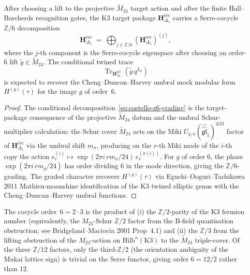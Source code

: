 \begin{theorem}
\label{thm:costello-z6-graded-H-Delta5}
After choosing a lift to the projective
$\widetilde M_{24}$ target action and after the finite Hall--Borcherds
recognition gates, the K3 target package
$\mathbf{H}_{\Delta_5}^{\mathrm{rec}}$ carries a Serre-cocycle
$\mathbb{Z}/6$ decomposition
\begin{equation}
\label{eq:costello-z6-grading}
\mathbf{H}_{\Delta_5}^{\mathrm{rec}}
\;=\;
\bigoplus_{j\in\mathbb{Z}/6}
(\mathbf{H}_{\Delta_5}^{\mathrm{rec}})^{(j)},
\end{equation}
where the $j$-th component is the Serre-cocycle eigenspace after
choosing an order-$6$ lift \(\tilde g\in\widetilde M_{24}\). The
conditional twined trace
\[
\operatorname{Tr}_{\mathbf H_{\Delta_5}^{\mathrm{rec}}}
(\tilde g\,q^{L_0})
\]
is expected to recover the Cheng--Duncan--Harvey umbral mock modular
form $H^{(g)}(\tau)$ for the image $g$ of order~$6$.
\end{theorem}

\begin{proof}[Proof]
The conditional decomposition~\eqref{eq:costello-z6-grading}
is the target-package consequence of the projective
$\widetilde M_{24}$ datum and the umbral Schur-multiplier calculation:
the Schur cover $\widetilde M_{24}$ acts on the Miki
$U_{q,\kappa}(\widehat{\widehat{\mathfrak{gl}}}_1)^{\otimes 24}$
factor of $\mathbf{H}_{\Delta_5}^{\mathrm{rec}}$ via the umbral shift
$m_\sigma$, producing on the $r$-th Miki mode of the $i$-th
copy the action $e^{(i)}_r \mapsto
\exp(2\pi i \, r m_\sigma/24)\,e^{(\sigma(i))}_r$. For
$g$ of order 6, the phase $\exp(2\pi i \, r m_g/24)$
has order dividing 6 in the mode direction, giving the
$\mathbb{Z}/6$-grading. The graded character recovers
$H^{(g)}(\tau)$ via Eguchi--Ooguri--Tachikawa 2011
Mathieu-moonshine identification of the K3 twined elliptic
genus with the Cheng--Duncan--Harvey umbral functions.
\end{proof}

\begin{remark}
\label{rem:costello-order-6-factorisation}
The cocycle order~$6 = 2\cdot 3$ is the product of (i) the
$\mathbb{Z}/2$-parity of the K3 fermion number
(equivalently, the $M_{24}$-Schur $\mathbb{Z}/2$ factor from
the B-field quantisation obstruction; see
Bridgeland--Maciocia 2001 Prop~4.1) and (ii) the $\mathbb{Z}/3$
from the lifting obstruction of the $M_{24}$-action on
$\mathrm{Hilb}^n(\mathrm{K3})$ to the $\widetilde M_{24}$
triple-cover. Of the three $\mathbb{Z}/12$ factors, only the
third-$\mathbb{Z}/2$ (the orientation ambiguity of the Mukai
lattice sign) is trivial on the Serre functor, giving order
$6 = 12/2$ rather than $12$.
\end{remark}

